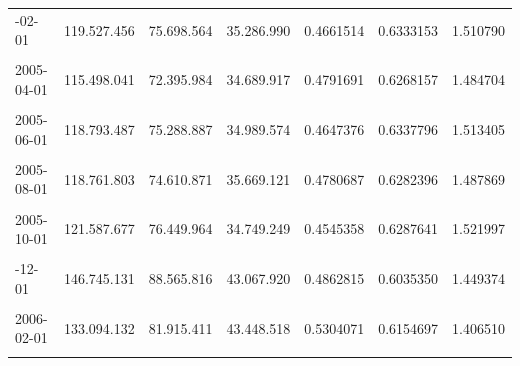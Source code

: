 \documentclass[12pt]{article}
\begin{document}
\begin{longtable}[t]{llllrrr}
\addlinespace
2005-02-01 & 119.527.456 & 75.698.564 & 35.286.990 & 0.4661514 & 0.6333153 & 1.510790\\
\cellcolor{gray!10}{2005-03-01} & \cellcolor{gray!10}{118.560.874} & \cellcolor{gray!10}{75.776.042} & \cellcolor{gray!10}{35.491.609} & \cellcolor{gray!10}{0.4683751} & \cellcolor{gray!10}{0.6391319} & \cellcolor{gray!10}{1.514643}\\
2005-04-01 & 115.498.041 & 72.395.984 & 34.689.917 & 0.4791691 & 0.6268157 & 1.484704\\
\cellcolor{gray!10}{2005-05-01} & \cellcolor{gray!10}{117.556.869} & \cellcolor{gray!10}{75.113.374} & \cellcolor{gray!10}{37.287.669} & \cellcolor{gray!10}{0.4964185} & \cellcolor{gray!10}{0.6389535} & \cellcolor{gray!10}{1.474416}\\
2005-06-01 & 118.793.487 & 75.288.887 & 34.989.574 & 0.4647376 & 0.6337796 & 1.513405\\
\addlinespace
\cellcolor{gray!10}{2005-07-01} & \cellcolor{gray!10}{118.562.751} & \cellcolor{gray!10}{73.692.328} & \cellcolor{gray!10}{35.413.152} & \cellcolor{gray!10}{0.4805541} & \cellcolor{gray!10}{0.6215470} & \cellcolor{gray!10}{1.476800}\\
2005-08-01 & 118.761.803 & 74.610.871 & 35.669.121 & 0.4780687 & 0.6282396 & 1.487869\\
\cellcolor{gray!10}{2005-09-01} & \cellcolor{gray!10}{123.969.884} & \cellcolor{gray!10}{78.288.945} & \cellcolor{gray!10}{34.424.632} & \cellcolor{gray!10}{0.4397126} & \cellcolor{gray!10}{0.6315158} & \cellcolor{gray!10}{1.547581}\\
2005-10-01 & 121.587.677 & 76.449.964 & 34.749.249 & 0.4545358 & 0.6287641 & 1.521997\\
\cellcolor{gray!10}{2005-11-01} & \cellcolor{gray!10}{128.417.217} & \cellcolor{gray!10}{81.279.829} & \cellcolor{gray!10}{38.377.882} & \cellcolor{gray!10}{0.4721698} & \cellcolor{gray!10}{0.6329356} & \cellcolor{gray!10}{1.501688}\\
\addlinespace
2005-12-01 & 146.745.131 & 88.565.816 & 43.067.920 & 0.4862815 & 0.6035350 & 1.449374\\
\cellcolor{gray!10}{2006-01-01} & \cellcolor{gray!10}{131.864.737} & \cellcolor{gray!10}{81.960.310} & \cellcolor{gray!10}{42.938.635} & \cellcolor{gray!10}{0.5238955} & \cellcolor{gray!10}{0.6215484} & \cellcolor{gray!10}{1.420297}\\
2006-02-01 & 133.094.132 & 81.915.411 & 43.448.518 & 0.5304071 & 0.6154697 & 1.406510\\
\cellcolor{gray!10}{2006-03-01} & \cellcolor{gray!10}{130.778.017} & \cellcolor{gray!10}{82.149.357} & \cellcolor{gray!10}{40.106.639} & \cellcolor{gray!10}{0.4882161} & \cellcolor{gray!10}{0.6281588} & \cellcolor{gray!10}{1.473799}\\

\end{longtable}
\end{document}
